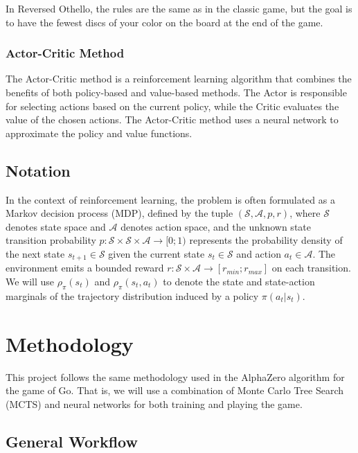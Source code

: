 \documentclass[conference]{IEEEtran}
\begin{document}
In Reversed Othello, the rules are the same as in the classic game, but the goal is to have the fewest discs of your color on the board at the end of the game.

\subsubsection{Actor-Critic Method}
The Actor-Critic method is a reinforcement learning algorithm that combines the benefits of both policy-based and value-based methods.
The Actor is responsible for selecting actions based on the current policy, while the Critic evaluates the value of the chosen actions.
The Actor-Critic method uses a neural network to approximate the policy and value functions.

\subsection{Notation}

In the context of reinforcement learning, the problem is often formulated as a Markov decision process (MDP), defined by the tuple $(\mathcal{S}, \mathcal{A}, p, r)$, where $\mathcal{S}$ denotes state space and $\mathcal{A}$ denotes action space, and the unknown state transition probability $p : \mathcal{S} \times \mathcal{S} \times \mathcal{A} \rightarrow [0; 1)$ represents the probability density of the next state $s_{t+1} \in \mathcal{S}$ given the current state $s_t \in \mathcal{S}$ and action $a_t \in \mathcal{A}$. The environment emits a bounded reward $r : \mathcal{S} \times \mathcal{A} \rightarrow [r_{min}; r_{max}]$ on each transition. 
We will use $\rho_\pi(s_t)$ and $\rho_\pi(s_t, a_t)$ to denote the state and state-action marginals of the trajectory distribution induced by a policy $\pi(a_t|s_t)$.

\section{Methodology}

This project follows the same methodology used in the AlphaZero algorithm for the game of Go\cite{silver2017mastering}.
That is, we will use a combination of Monte Carlo Tree Search (MCTS) and neural networks for both training and playing the game.

\subsection{General Workflow}
\end{document}
